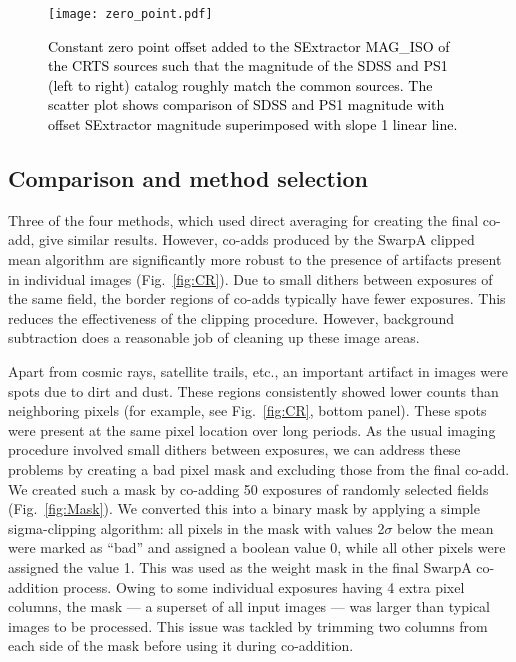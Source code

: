 \documentclass[fleqn,usenatbib]{mnras}
\begin{document}
\begin{figure}
\texttt{[image: zero\_point.pdf]}
\caption{\textcolor{black}{Constant zero point offset added to the SExtractor MAG\_ISO of the CRTS sources such that the magnitude of the SDSS and PS1 (left to right) catalog roughly match the common sources. The scatter plot shows comparison of SDSS and PS1 magnitude with offset SExtractor magnitude superimposed with slope 1 linear line. } }
\label{fig:survey_zero} 
\end{figure}


\subsection{Comparison and method selection}\label{subsec:compare}
Three of the four methods, which used direct averaging for creating the final co-add, give similar results. However, co-adds produced by the SwarpA clipped mean algorithm are significantly more robust to the presence of  artifacts present in individual images (Fig.~\ref{fig:CR}). Due to small dithers between exposures of the same field, the border regions of co-adds typically have fewer exposures. This reduces the effectiveness of the clipping procedure. However, background subtraction does a reasonable job of cleaning up these image areas.


Apart from cosmic rays, satellite trails, etc., an important artifact in images were spots due to dirt and dust. These regions consistently showed lower counts than neighboring pixels (for example, see Fig.~\ref{fig:CR}, bottom panel). These spots were present at the same pixel location over long periods. As the usual imaging procedure involved small dithers between exposures, we can address these problems by creating a bad pixel mask and excluding those from the final co-add. We created such a mask by co-adding 50 exposures of randomly selected fields (Fig.~\ref{fig:Mask}). We converted this into a binary mask by applying a simple sigma-clipping algorithm: all pixels in the mask with values 2$\sigma$ below the mean were marked as ``bad'' and assigned a boolean value 0, while all other pixels were assigned the value 1. This was used as the weight mask in the final SwarpA co-addition process. Owing to some individual exposures having 4 extra pixel columns, the mask --- a superset of all input images --- was larger than typical images to be processed. This issue was tackled by trimming two columns from each side of the mask before using it during co-addition.
\end{document}
